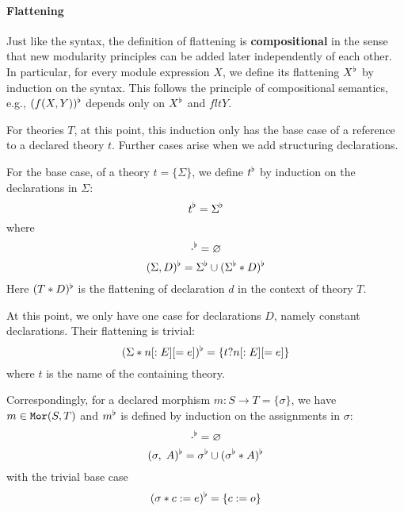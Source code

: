 \paragraph{Flattening}
Just like the syntax, the definition of flattening is \textbf{compositional} in the sense that new modularity principles can be added later independently of each other.
In particular, for every module expression $X$, we define its flattening $X^\flat$ by induction on the syntax.
This follows the principle of compositional semantics, e.g., $(f(X,Y))^\flat$ depends only on $X^\flat$ and $flt{Y}$. 

For theories $T$, at this point, this induction only has the base case of a reference to a declared theory $t$.
Further cases arise when we add structuring declarations.

For the base case, of a theory $t=\{\Sigma\}$, we define $t^\flat$ by induction on the declarations in $\Sigma$:
\[t^\flat=\Sigma^\flat\]
where
 \[\cdot^\flat=\varnothing\]
 \[(\Sigma,D)^\flat=\Sigma^\flat\cup(\Sigma^\flat\ast D)^\flat\]
Here $(T\ast D)^\flat$ is the flattening of declaration $d$ in the context of theory $T$.

At this point, we only have one case for declarations $D$, namely constant declarations.
Their flattening is trivial:
 \[(\Sigma\ast n[:E][=e])^\flat=\{t?n[:E][=e]\}\]
where $t$ is the name of the containing theory.

Correspondingly, for a declared morphism $m:S\to T=\{\sigma\}$, we have $m\in\mathtt{Mor}(S,T)$ and $m^\flat$ is defined by induction on the assignments in $\sigma$:
 \[\cdot^\flat=\varnothing\]
 \[(\sigma,\;A)^\flat=\sigma^\flat\cup(\sigma^\flat\ast A)^\flat\]
with the trivial base case
 \[(\sigma\ast c:=e)^\flat=\{c:=o\}\]

